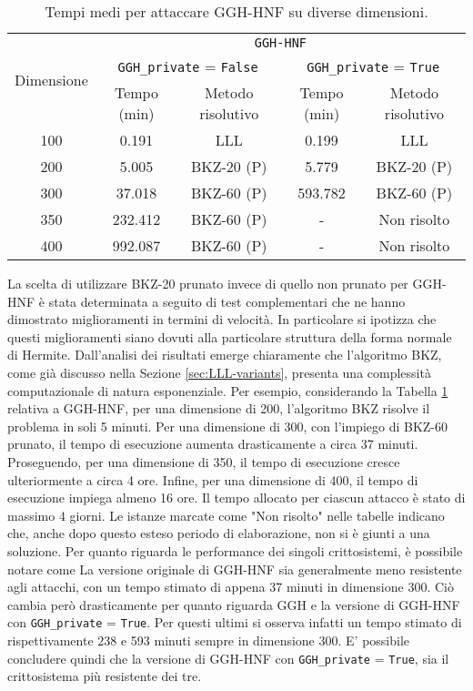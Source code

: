 \begin{table}[H]
    \centering
    \begin{tabular}{|c|c|c|c|c|}
    \hline
    \multirow{3}{*}{Dimensione} & 
    \multicolumn{4}{c|}{\texttt{GGH-HNF}} \\ %
    \cline{2-5}
     & \multicolumn{2}{c|}{\texttt{GGH\_private} = \texttt{False}} &
     \multicolumn{2}{c|}{\texttt{GGH\_private} = \texttt{True}} \\
    \cline{2-5}
     & Tempo (min) & Metodo risolutivo & Tempo (min) & Metodo risolutivo \\
    \hline
    100 & 0.191 & LLL & 0.199 & LLL \\
    \hline
    200 & 5.005 & BKZ-20 (P) & 5.779 & BKZ-20 (P)\\
    \hline
    300 & 37.018 & BKZ-60 (P) & 593.782 & BKZ-60 (P)\\
    \hline
    350 & 232.412 & BKZ-60 (P) & - & Non risolto\\
    \hline
    400 & 992.087 & BKZ-60 (P) & - & Non risolto \\
    \hline
    \end{tabular}
    \caption{Tempi medi per attaccare GGH-HNF su diverse dimensioni.}
    \label{tab:risultati-gghhnf-attacchi}
\end{table}

La scelta di utilizzare BKZ-20 prunato invece di quello non prunato per GGH-HNF è stata 
determinata a seguito di test complementari che ne hanno dimostrato miglioramenti in 
termini di velocità. In particolare si ipotizza che questi miglioramenti siano dovuti
alla particolare struttura della forma normale di Hermite.
Dall'analisi dei risultati emerge chiaramente che l'algoritmo BKZ, come già discusso nella Sezione 
\ref{sec:LLL-variants}, presenta una complessità computazionale di natura esponenziale.
Per esempio, considerando la Tabella \ref{tab:risultati-gghhnf-attacchi} relativa a GGH-HNF, 
per una dimensione di 200, l'algoritmo 
BKZ risolve il problema in 
soli 5 minuti. Per una dimensione di 300, 
con l'impiego di BKZ-60 prunato, il tempo di esecuzione aumenta drasticamente a circa 37 minuti. 
Proseguendo, per una dimensione di 350, il tempo di esecuzione cresce ulteriormente a circa 
4 ore. Infine, per una dimensione di 400, il tempo di esecuzione impiega almeno 16 ore.
Il tempo allocato per ciascun attacco è stato di massimo 4 giorni.
Le istanze marcate come "Non risolto" nelle tabelle 
indicano che, anche dopo questo esteso periodo di elaborazione, non si è giunti a una soluzione. 
Per quanto riguarda le performance dei singoli crittosistemi, è possibile notare come La
versione originale di GGH-HNF sia generalmente meno resistente agli attacchi, con un tempo stimato di 
appena 37 minuti in dimensione 300. Ciò cambia però drasticamente per quanto riguarda
GGH e la versione di GGH-HNF con \texttt{GGH\_private} = \texttt{True}. Per questi ultimi
si osserva infatti un tempo stimato di rispettivamente 238 e 593 minuti sempre in dimensione
300. E' possibile concludere quindi che la versione di GGH-HNF con 
\texttt{GGH\_private} = \texttt{True}, sia il crittosistema più resistente dei tre. 

